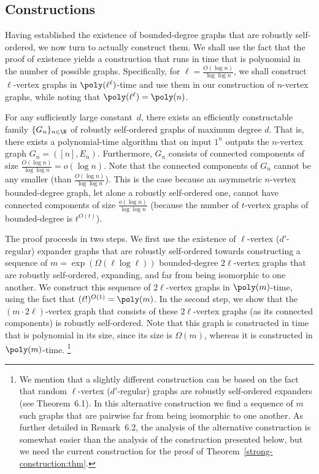 \subsection{Constructions}
\label{step2:sec}
Having established the existence of bounded-degree graphs that
are robustly self-ordered, we now turn to actually construct them.
We shall use the fact that the proof of existence yields
a construction that runs in time that is polynomial in the
number of possible graphs.
Specifically, for $\ell=\frac{O(\log n)}{\log\log n}$,
we shall construct $\ell$-vertex graphs in $\poly(\ell^\ell)$-time
and use them in our construction of $n$-vertex graphs,
while noting that $\poly(\ell^\ell)=\poly(n)$.

\label{construction:thm}  \label{CONSTRUCTION:THM}   
For any sufficiently large constant~$d$,
there exists an efficiently constructable family $\{G_n\}_{n\in\N}$
of robustly self-ordered graphs of maximum degree $d$.
That is, there exists a polynomial-time algorithm
that on input $1^n$ outputs the $n$-vertex graph $G_n=([n],E_n)$.
Furthermore, $G_n$ consists of connected components
of size $\frac{O(\log n)}{\log\log n}=o(\log n)$.
%
\ET
Note that the connected components of $G_n$ cannot be any smaller
(than $\frac{O(\log n)}{\log\log n}$).
This is the case because an asymmetric $n$-vertex bounded-degree graph,
let alone a robustly self-ordered one, cannot have connected components
of size $\frac{o(\log n)}{\log\log n}$ (because the number of $t$-vertex
graphs of bounded-degree is $t^{O(t)}$).
%
\medskip

\BPF
The proof proceeds in two steps.
We first use the existence of $\ell$-vertex ($d'$-regular)
expander graphs that are robustly self-ordered
towards constructing a sequence of $m=\exp(\Omega(\ell\log\ell))$
bounded-degree $2\ell$-vertex graphs that are robustly self-ordered,
expanding, and far from being isomorphic to one another.
We construct this sequence of $2\ell$-vertex graphs in $\poly(m)$-time,
using the fact that $(\ell!)^{O(1)}=\poly(m)$.
In the second step, we show that the $(m\cdot2\ell)$-vertex graph
that consists of these $2\ell$-vertex graphs (as its connected components)
is robustly self-ordered.
Note that this graph is constructed in time that is
polynomial in its size, since its size is $\Omega(m)$,
whereas it is constructed in $\poly(m)$-time.
\footnote{We mention that a slightly different construction can be
based on the fact that random $\ell$-vertex ($d'$-regular) graphs
are robustly self-ordered expanders (see Theorem~6.1).
In this alternative construction we find a sequence of $m$ such
graphs that are pairwise far from being isomorphic to one another.
As further detailed in Remark~6.2,
the analysis of the alternative construction is somewhat easier
than the analysis of the construction presented below,
but we need the current construction for the proof
of Theorem~\ref{strong-construction:thm}.}

